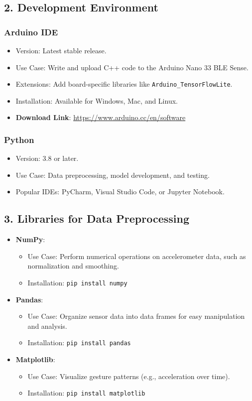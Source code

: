 \subsection{2. Development Environment}

\subsubsection{Arduino IDE}
\begin{itemize}
    \item Version: Latest stable release.
    \item Use Case: Write and upload C++ code to the Arduino Nano 33 BLE Sense.
    \item Extensions: Add board-specific libraries like \texttt{Arduino\_TensorFlowLite}.
    \item Installation: Available for Windows, Mac, and Linux.
    \item \textbf{Download Link}: \url{https://www.arduino.cc/en/software}
\end{itemize}

\subsubsection{Python}
\begin{itemize}
    \item Version: 3.8 or later.
    \item Use Case: Data preprocessing, model development, and testing.
    \item Popular IDEs: PyCharm, Visual Studio Code, or Jupyter Notebook.
\end{itemize}

\subsection{3. Libraries for Data Preprocessing}
\begin{itemize}
    \item \textbf{NumPy}: 
    \begin{itemize}
        \item Use Case: Perform numerical operations on accelerometer data, such as normalization and smoothing.
        \item Installation: \texttt{pip install numpy}
    \end{itemize}
    \item \textbf{Pandas}: 
    \begin{itemize}
        \item Use Case: Organize sensor data into data frames for easy manipulation and analysis.
        \item Installation: \texttt{pip install pandas}
    \end{itemize}
    \item \textbf{Matplotlib}: 
    \begin{itemize}
        \item Use Case: Visualize gesture patterns (e.g., acceleration over time).
        \item Installation: \texttt{pip install matplotlib}
    \end{itemize}
\end{itemize}

